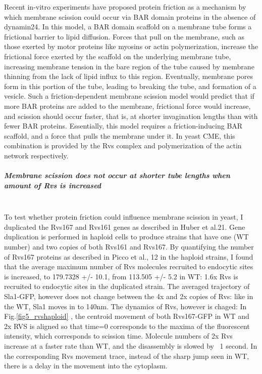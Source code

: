 	Recent in-vitro experiments have proposed protein friction as a mechanism by which membrane scission could occur via BAR domain proteins in the absence of dynamin24. In this model, a BAR domain scaffold on a membrane tube forms a frictional barrier to lipid diffusion. Forces that pull on the membrane, such as those exerted by motor proteins like myosins or actin polymerization, increase the frictional force exerted by the scaffold on the underlying membrane tube, increasing membrane tension in the bare region of the tube caused by membrane thinning from the lack of lipid influx to this region. Eventually, membrane pores form in this portion of the tube, leading to breaking the tube, and formation of a vesicle. Such a friction-dependent membrane scission model would predict that if more BAR proteins are added to the membrane, frictional force would increase, and scission should occur faster, that is, at shorter invagination lengths than with fewer BAR proteins. Essentially, this model requires a friction-inducing BAR scaffold, and a force that pulls the membrane under it. In yeast CME, this combination is provided by the Rvs complex and polymerization of the actin network respectively. 
	


		\subparagraph{Membrane scission does not occur at shorter tube lengths when amount of Rvs is increased}
		\mbox{}\\
		To test whether protein friction could influence membrane scission in yeast, I duplicated the Rvs167 and Rvs161 genes as described in Huber et al.21. Gene duplication is performed in haploid cells to produce strains that have one (WT number) and two copies of both Rvs161 and Rvs167. By quantifying the number of Rvs167 proteins as described in Picco et al., 12  in the haploid strains, I found that the average maximum number of Rvs molecules recruited to endocytic sites is increased, to 179.7328 +/- 10.1, from 113.505 +/- 5.2 in WT:  1.6x Rvs is recruited to endocytic sites in the duplicated strain. The averaged trajectory of Sla1-GFP, however does not change between the 4x and 2x copies of Rvs: like in the WT, Sla1 moves in to 140nm. The dynamics of Rvs, however is chaged: In Fig.\ref{fig5_rvshaploid} , the centroid movement of both Rvs167-GFP in WT and 2x RVS is aligned so that time=0 corresponds to the maxima of the fluorescent intensity, which corresponds to scission time. Molecule numbers of 2x Rvs increase at a faster rate than WT, and the disassembly is slowed by ~1 second. In the corresponding Rvs movement trace, instead of the sharp jump seen in WT, there is a delay in the movement into the cytoplasm.
		
